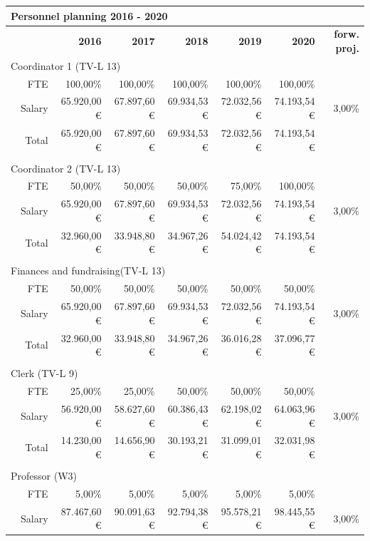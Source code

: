 \documentclass[output=guidelines,nonflat,smallfont,
draftmode
]{langsci/langscibook}
\begin{document}
{{\begin{tabular}{lrrrrrrr}
\multicolumn{5}{l}{ \textbf{{Personnel planning 2016} - 2020}}\\
\midrule
& & \textbf{2016} & \textbf{2017} & \textbf{2018} & \textbf{2019} & \textbf{2020} & \textbf{forw. proj.}\\
\midrule 
\multicolumn{5}{l}{ Coordinator 1 (TV-L 13)}\\
\midrule
&  FTE &  100,00\% &  100,00\% &  100,00\% &  100,00\% &  100,00\% & ~\\
&  Salary &  65.920,00 € &  67.897,60 € &  69.934,53 € &  72.032,56 € &  74.193,54 € &  3,00\%\\
 &  Total &  65.920,00 € &  67.897,60 € &  69.934,53 € &  72.032,56 € &  74.193,54 € & ~\\
\\
\multicolumn{5}{l}{ Coordinator 2 (TV-L 13)}\\
\midrule
&  FTE &  50,00\% &  50,00\% &  50,00\% &  75,00\% &  100,00\% & ~\\
&  Salary &  65.920,00 € &  67.897,60 € &  69.934,53 € &  72.032,56 € &  74.193,54 € &  3,00\%\\
 &  Total &  32.960,00 € &  33.948,80 € &  34.967,26 € &  54.024,42 € &  74.193,54 € & ~\\
\\
\multicolumn{5}{l}{ Finances and fundraising(TV-L 13)}\\
\midrule
&  FTE &  50,00\% &  50,00\% &  50,00\% &  50,00\% &  50,00\% & ~\\
&  Salary &  65.920,00 € &  67.897,60 € &  69.934,53 € &  72.032,56 € &  74.193,54 € &  3,00\%\\
 &  Total &  32.960,00 € &  33.948,80 € &  34.967,26 € &  36.016,28 € &  37.096,77 € & ~\\
\\
\multicolumn{5}{l}{ Clerk (TV-L 9)}\\
\midrule
&  FTE &  25,00\% &  25,00\% &  50,00\% &  50,00\% &  50,00\% & ~\\
&  Salary &  56.920,00 € &  58.627,60 € &  60.386,43 € &  62.198,02 € &  64.063,96 € &  3,00\%\\
 &  Total &  14.230,00 € &  14.656,90 € &  30.193,21 € &  31.099,01 € &  32.031,98 € & ~\\
\\
\multicolumn{5}{l}{ Professor (W3)}\\
\midrule
&  FTE &  5,00\% &  5,00\% &  5,00\% &  5,00\% &  5,00\% & ~\\
&  Salary &  87.467,60 € &  90.091,63 € &  92.794,38 € &  95.578,21 € &  98.445,55 € &  3,00\%\\

\end{tabular}}}
\end{document}

